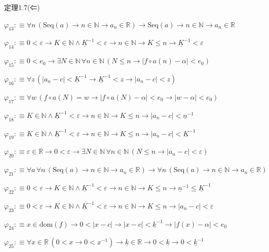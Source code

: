 \begin{fullproof}{定理1.7(⇐)}
\begin{abbrevlist}
\item $\varphi_{13} :\equiv \forall n\,(\mathrm{Seq}(a) \to n \in \mathbb{N} \to a_{n} \in \mathbb{R}) \to \mathrm{Seq}(a) \to n \in \mathbb{N} \to a_{n} \in \mathbb{R}$
\item $\varphi_{14} :\equiv 0 < \varepsilon \to K \in \mathbb{N} \land \underline{K}^{-1} < \varepsilon \to n \in \mathbb{N} \to K \leq n \to \underline{K}^{-1} < \varepsilon$
\item $\varphi_{15} :\equiv 0 < e_{0} \to \exists N \in \mathbb{N}\,\forall n \in \mathbb{N}\,(N \leq n \to \lvert f \circ a(n) - \alpha \rvert < e_{0})$
\item $\varphi_{16} :\equiv \forall z\,(\lvert a_{n} - c \rvert < \underline{K}^{-1} \to \underline{K}^{-1} < z \to \lvert a_{n} - c \rvert < z)$
\item $\varphi_{17} :\equiv \forall w\,(f \circ a(N) = w \to \lvert f \circ a(N) - \alpha \rvert < e_{0} \to \lvert w - \alpha \rvert < e_{0})$
\item $\varphi_{18} :\equiv K \in \mathbb{N} \land \underline{K}^{-1} < \varepsilon \to n \in \mathbb{N} \to K \leq n \to \lvert a_{n} - c \rvert < \underline{n}^{-1}$
\item $\varphi_{19} :\equiv K \in \mathbb{N} \land \underline{K}^{-1} < \varepsilon \to n \in \mathbb{N} \to K \leq n \to \lvert a_{n} - c \rvert < \underline{K}^{-1}$
\item $\varphi_{20} :\equiv \varepsilon \in \mathbb{R} \to 0 < \varepsilon \to \exists N \in \mathbb{N}\,\forall n \in \mathbb{N}\,(N \leq n \to \lvert a_{n} - c \rvert < \varepsilon)$
\item $\varphi_{21} :\equiv \forall a\,\forall n\,(\mathrm{Seq}(a) \to n \in \mathbb{N} \to a_{n} \in \mathbb{R}) \to \forall n\,(\mathrm{Seq}(a) \to n \in \mathbb{N} \to a_{n} \in \mathbb{R})$
\item $\varphi_{22} :\equiv 0 < \varepsilon \to K \in \mathbb{N} \land \underline{K}^{-1} < \varepsilon \to n \in \mathbb{N} \to K \leq n \to \underline{n}^{-1} \leq \underline{K}^{-1}$
\item $\varphi_{23} :\equiv 0 < \varepsilon \to K \in \mathbb{N} \land \underline{K}^{-1} < \varepsilon \to n \in \mathbb{N} \to K \leq n \to \lvert a_{n} - c \rvert < \varepsilon$
\item $\varphi_{24} :\equiv x \in \mathrm{dom}(f) \to 0 < \lvert x - c \rvert \to \lvert x - c \rvert < \underline{k}^{-1} \to \lvert f(x) - \alpha \rvert < e_{0}$
\item $\varphi_{25} :\equiv \forall x \in \mathbb{R}\,(0 < x \to 0 < x^{-1}) \to \underline{k} \in \mathbb{R} \to 0 < \underline{k} \to 0 < \underline{k}^{-1}$

\end{abbrevlist}
\end{fullproof}
